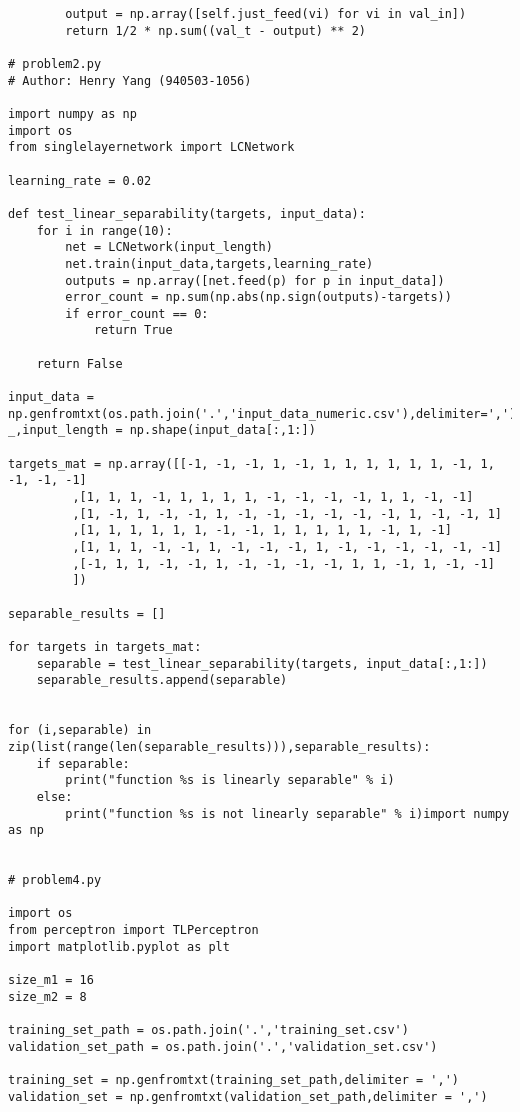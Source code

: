 \begin{verbatim}
        output = np.array([self.just_feed(vi) for vi in val_in])
        return 1/2 * np.sum((val_t - output) ** 2)

# problem2.py
# Author: Henry Yang (940503-1056)

import numpy as np
import os
from singlelayernetwork import LCNetwork

learning_rate = 0.02

def test_linear_separability(targets, input_data): 
    for i in range(10):
        net = LCNetwork(input_length)
        net.train(input_data,targets,learning_rate)
        outputs = np.array([net.feed(p) for p in input_data])
        error_count = np.sum(np.abs(np.sign(outputs)-targets))
        if error_count == 0:
            return True
    
    return False

input_data = np.genfromtxt(os.path.join('.','input_data_numeric.csv'),delimiter=',')
_,input_length = np.shape(input_data[:,1:])

targets_mat = np.array([[-1, -1, -1, 1, -1, 1, 1, 1, 1, 1, 1, -1, 1, -1, -1, -1]
         ,[1, 1, 1, -1, 1, 1, 1, 1, -1, -1, -1, -1, 1, 1, -1, -1]
         ,[1, -1, 1, -1, -1, 1, -1, -1, -1, -1, -1, -1, 1, -1, -1, 1]
         ,[1, 1, 1, 1, 1, 1, -1, -1, 1, 1, 1, 1, 1, -1, 1, -1]
         ,[1, 1, 1, -1, -1, 1, -1, -1, -1, 1, -1, -1, -1, -1, -1, -1]
         ,[-1, 1, 1, -1, -1, 1, -1, -1, -1, -1, 1, 1, -1, 1, -1, -1]
         ])

separable_results = []

for targets in targets_mat:
    separable = test_linear_separability(targets, input_data[:,1:])
    separable_results.append(separable)


for (i,separable) in zip(list(range(len(separable_results))),separable_results):
    if separable:
        print("function %s is linearly separable" % i)
    else:
        print("function %s is not linearly separable" % i)import numpy as np


# problem4.py

import os
from perceptron import TLPerceptron
import matplotlib.pyplot as plt

size_m1 = 16
size_m2 = 8

training_set_path = os.path.join('.','training_set.csv')
validation_set_path = os.path.join('.','validation_set.csv')

training_set = np.genfromtxt(training_set_path,delimiter = ',')
validation_set = np.genfromtxt(validation_set_path,delimiter = ',')


\end{verbatim}
